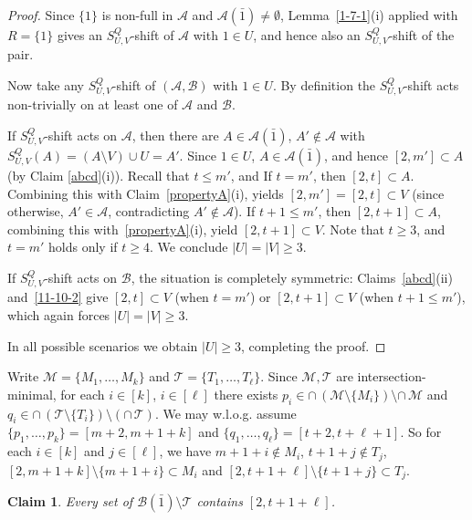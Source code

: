 \documentclass[11pt]{article}
\def\marrow{{\boldmath {\marginpar[\hfill$\rightarrow \rightarrow$]{$\leftarrow \leftarrow$}}}}
\def\andrey#1{{\sc Andrey: }{\marrow\sf \textcolor{blue}{#1}}}
\newcommand{\m}{\mathcal}
\newtheorem{claim}[theorem]{Claim}
\begin{document}
\begin{proof}
Since $\{1\}$ is non-full in $\mathcal A$ and
$\mathcal A(\bar1)\ne\emptyset$, Lemma~\ref{1-7-1}(i)
applied with $R=\{1\}$ gives an $S^Q_{U,V}$-shift of
$\mathcal A$ with $1\in U$, and hence also an
$S^Q_{U,V}$-shift of the pair.

Now take any $S_{U,V}^Q$-shift of $(\mathcal{A},\mathcal{B})$ with $1\in U$.
By definition the $S_{U,V}^Q$-shift acts non-trivially on at least one of $\mathcal{A}$ and $\mathcal{B}$.

If $S_{U,V}^Q$-shift acts on $\mathcal{A}$, then there are $A\in\mathcal{A}(\bar1)$, $A'\notin\mathcal{A}$ with $S_{U,V}^Q(A)=(A\setminus V)\cup U=A'$. Since $1\in U$, $A\in \m A(\bar1)$, and hence $[2,m']\subset A$ (by Claim \ref{abcd}(i)). 
Recall that  $t\le m'$, and   
If $t=m'$, then  $[2,t]\subset A$. Combining this with Claim~\ref{propertyA}(i),  yields 
$[2,m']=[2,t]\subset V$ (since otherwise, $A'\in \m A$, contradicting $A'\notin\mathcal{A}$). 
If $t+1\le m'$, then $[2,t+1]\subset A$, combining this with~\ref{propertyA}(i), yield $[2,t+1]\subset V$.
Note that $t\ge 3$, and $t=m'$ holds only if $t\ge 4$. We conclude  $|U|=|V|\ge 3$.

If $S_{U,V}^Q$-shift acts on $\mathcal{B}$, the situation is completely symmetric: 
Claims~\ref{abcd}(ii) and~\ref{11-10-2} give  
$[2,t]\subset V$ (when $t=m'$) or $[2,t+1]\subset V$ (when $t+1\le m'$), 
which again forces $|U|=|V|\ge 3$.

In all possible scenarios we obtain $|U|\ge 3$, completing the proof.
\end{proof}



Write $\mathcal{M}=\{M_1, \dots, M_{k}\}$ and $\mathcal{T}=\{T_1, \dots, T_{\ell}\}$.
Since $\mathcal{M}, \mathcal{T}$ are intersection-minimal, for each $i\in [k]$, $i\in [\ell]$ there exists 
$
p_i\in \cap\,(\mathcal{M}\setminus \{M_i\})\setminus \cap \,\mathcal{M}$ and $q_i\in \cap\,(\mathcal{T}\setminus \{T_i\})\setminus (\cap \,\mathcal{T})$.
We may w.l.o.g. assume $\{p_1, \dots, p_k\}=[m+2, m+1+k]$ and $\{q_1, \dots, q_{\ell}\}=[t+2, t+\ell+1]$.
So for each $i\in [k]$ and $j\in [\ell]$, we have
$m+1+i\not\in M_i$, $t+1+j\not\in T_j$,
$[2, m+1+k]\setminus \{m+1+i\}\subset M_i$ and $[2,t+1+\ell]\setminus \{t+1+j\}\subset T_j$. 


\begin{claim}\label{11-13-1}
Every set of $\mathcal{B}(\bar{1})\setminus \mathcal{T}$ contains $[2, t+1+\ell]$. 
\end{claim}
\end{document}

